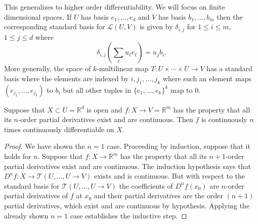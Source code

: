 \documentclass[twoside, a4paper, 10pt]{amsart}
\begin{document}
This generalizes to higher order differentiability. We will focus on finite dimensional spaces. If $U$ has basis $e_1, \ldots, e_d$ and $V$ has basis $b_1, \ldots, b_m$ then the corresponding standard basis for $\mathcal{L}(U,V)$ is given by $\delta_{i,j}$ for $1 \leq i \leq m$, $1 \leq j \leq d$ where $$\delta_{i,j}\left( \sum_{\ell} u_{\ell} e_{\ell} \right) = u_j b_i.$$ More generally, the space of $k$-multilinear map $T:U \times \cdots \times U \to V$ has a standard basis where the elements are indexed by $i, j_1, \ldots, j_k$ where such an element maps  $(e_{j_1}, \ldots, e_{j_k})$ to $b_i$ but all other tuples in $\{e_1, \ldots, e_k\}^k$ map to $0$.

\begin{thm}  Suppose that $X \subset U = \mathbb{R}^d$ is open and $f:X \to V = \mathbb{R}^m$ has the property that all its $n$-order partial derivatives exist and are continuous. Then $f$ is continuously $n$ times continuously differentiable on $X$. \end{thm} 

\begin{proof} We have shown the $n=1$ case. Proceeding by induction, suppose that it holds for $n$. Suppose that $f:X \to \mathbb{R}^m$ has the property that all its $n+1$-order partial derivatives exist and are continuous. The induction hypothesis says that $D^nf: X \to \mathcal{T}( U, \ldots, U \to V)$ exists and is continuous. But with respect to the standard basis for $\mathcal{T}( U, \ldots, U \to V)$ the coefficients of $D^nf(x_0)$ are $n$-order partial derivatives of $f$ at $x_0$ and their partial derivatives are the order $(n+1)$ partial derivatives, which exist and are continuous by hypothesis. Applying the already shown $n=1$ case establishes the inductive step.

\end{proof}


\end{document}
